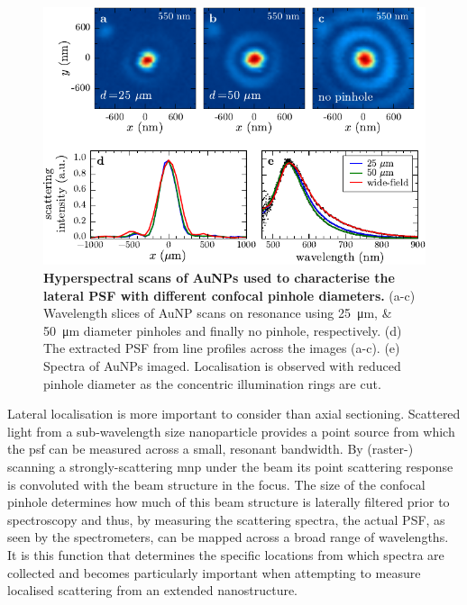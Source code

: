 \documentclass{article}
\begin{document}
\begin{figure}[bt]
\centering
\includegraphics{figures/lateral_aunp_scans}
\caption[Hyperspectral scans of AuNPs used to characterise the lateral PSF with different confocal pinhole diameters.]{\textbf{Hyperspectral scans of AuNPs used to characterise the lateral PSF with different confocal pinhole diameters.} (a-c) Wavelength slices of AuNP scans on resonance using \SIlist{25;50}{\micro\metre} diameter pinholes and finally no pinhole, respectively. (d) The extracted PSF from line profiles across the images (a-c). (e) Spectra of AuNPs imaged. Localisation is observed with reduced pinhole diameter as the concentric illumination rings are cut.}
\label{fig:lateral_psf}
\end{figure}

Lateral localisation is more important to consider than axial sectioning. Scattered light from a sub-wavelength size nanoparticle provides a point source from which the \gls{psf} can be measured across a small, resonant bandwidth. By (raster-) scanning a strongly-scattering \gls{mnp} under the beam its point scattering response is convoluted with the beam structure in the focus. The size of the confocal pinhole determines how much of this beam structure is laterally filtered prior to spectroscopy and thus, by measuring the scattering spectra, the actual PSF, as seen by the spectrometers, can be mapped across a broad range of wavelengths. It is this function that determines the specific locations from which spectra are collected and becomes particularly important when attempting to measure localised scattering from an extended nanostructure.
\end{document}
